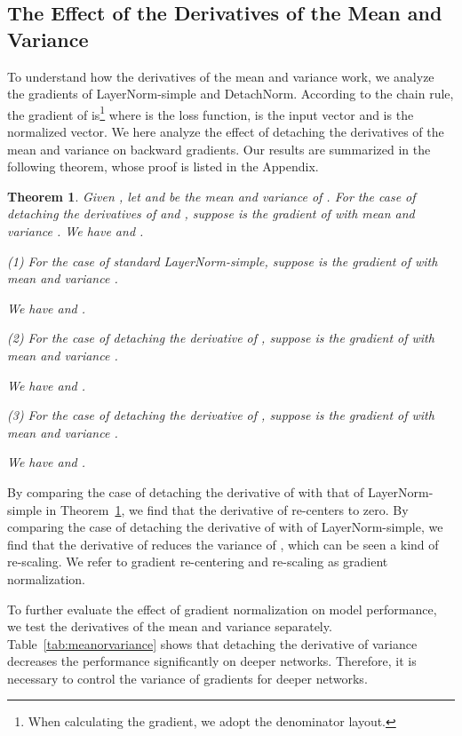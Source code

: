 \documentclass{article}
\newtheorem{thm}{Theorem}[]
\begin{document}
\subsection{The Effect of the Derivatives of the Mean and Variance}
To understand how the derivatives of the mean and variance work, we analyze the gradients of LayerNorm-simple and DetachNorm. According to the chain rule, the gradient of  is\footnote{When calculating the gradient, we adopt the denominator layout.}
where  is the loss function,  is the input vector and  is the normalized vector. We here analyze the effect of detaching the derivatives of the mean and variance on backward gradients. Our results are summarized in the following theorem, whose proof is listed in 
the Appendix.

\begin{thm}
\label{thm1}
Given , let  and  be the mean and variance of .  For the case of detaching the derivatives of  and ,  suppose  is the gradient of  with mean   and variance . 
We have   and .


\quad (1) For the case of standard LayerNorm-simple, suppose  is the gradient of  with mean  and variance . 
\begin{center}
We have  and .  
\end{center}

 \quad(2) For the case of detaching the derivative of , suppose  is the gradient of  with mean  and variance .
\begin{center}
We have  and .
\end{center}
 \quad(3) For the case of detaching the derivative of , suppose  is the gradient of  with mean  and variance . 
\begin{center}
We have  and .
\end{center}

\end{thm}

By comparing the case of detaching the derivative of  with that of LayerNorm-simple in Theorem~\ref{thm1}, we find that the derivative of  re-centers  to zero. 
By comparing the case of detaching the derivative of  with of LayerNorm-simple, we find that  the derivative of  reduces the variance of , which can be seen a kind of re-scaling.  We refer to gradient re-centering and re-scaling as gradient normalization.




To further evaluate the effect of gradient normalization on model performance, we test the derivatives of the mean and variance separately. Table~\ref{tab:meanorvariance} shows that detaching the derivative of variance decreases the performance significantly on deeper networks. Therefore, it is necessary to control the variance of gradients for deeper networks. 
\end{document}
